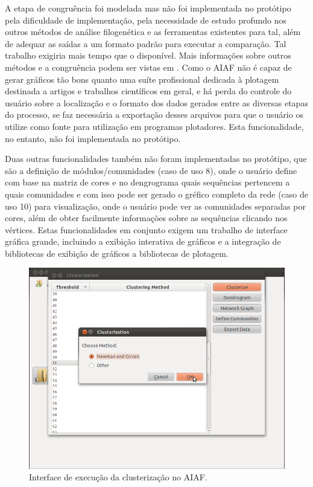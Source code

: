 A etapa de congruência foi modelada mas não foi implementada no protótipo pela dificuldade de implementação, pela necessidade de estudo profundo nos outros
métodos de análise filogenética e as ferramentas existentes para tal, além de adequar as saídas a um formato padrão para executar a comparação. Tal trabalho
exigiria mais tempo que o disponível. Mais informações sobre outros métodos e a congruência podem
ser vistas em \cite{marcelo2010}. Como o AIAF não é capaz de gerar gráficos tão bons quanto uma suíte profissional dedicada à plotagem destinada a artigos e
trabalhos científicos em geral, e há perda do controle do usuário sobre a localização e o formato dos dados gerados entre as diversas etapas do processo, se
faz necessária a exportação desses arquivos para que o usuário os utilize como fonte para utilização em programas plotadores.
Esta funcionalidade, no entanto, não foi implementada no protótipo.

Duas outras funcionalidades também não foram implementadas no protótipo, que são a definição de módulos/comunidades (caso de uso 8), onde o usuário define
com base na matriz de cores e no dengrograma quais sequências pertencem a quais comunidades e com isso pode ser gerado o gréfico completo da rede (caso de
uso 10) para visualização, onde o usuário pode ver as comunidades separadas por cores, além de obter facilmente informações sobre as sequências clicando nos
vértices. Estas funcionalidades em conjunto
exigem um trabalho de interface gráfica grande, incluindo a exibição interativa de gráficos e a integração de bibliotecas de exibição de
gráficos a bibliotecas de plotagem.

\begin{figure}
\centering
\includegraphics[scale=0.38]{clustering-gui}
\caption{Interface de execução da clusterização no AIAF.}
\label{fig:clustering-gui}
\end{figure}

